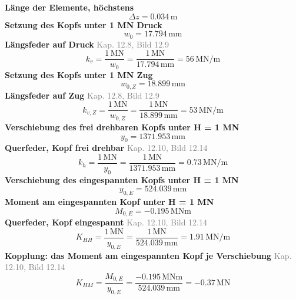 \documentclass[11pt,a4paper]{article}
\newcommand{\normref}[1]{{\small\textcolor{gray}{#1}}}
\begin{document}
\noindent\textbf{Länge der Elemente, höchstens}
\begin{equation*}
\Delta z = 0.034\,\mathrm{m}
\end{equation*}
\noindent\textbf{Setzung des Kopfs unter 1 MN Druck}
\begin{equation*}
w_0 = 17.794\,\mathrm{mm}
\end{equation*}
\noindent\textbf{Längsfeder auf Druck} \hfill \normref{Kap. 12.8, Bild 12.9}
\begin{equation*}
k_v = \frac{1\,\mathrm{MN}}{w_0} = \frac{1\,\mathrm{MN}}{17.794\,\mathrm{mm}} = 56\,\mathrm{MN}/\mathrm{m}
\end{equation*}
\noindent\textbf{Setzung des Kopfs unter 1 MN Zug}
\begin{equation*}
w_{0,Z} = 18.899\,\mathrm{mm}
\end{equation*}
\noindent\textbf{Längsfeder auf Zug} \hfill \normref{Kap. 12.8, Bild 12.9}
\begin{equation*}
k_{v,Z} = \frac{1\,\mathrm{MN}}{w_{0,Z}} = \frac{1\,\mathrm{MN}}{18.899\,\mathrm{mm}} = 53\,\mathrm{MN}/\mathrm{m}
\end{equation*}
\noindent\textbf{Verschiebung des frei drehbaren Kopfs unter H = 1 MN}
\begin{equation*}
y_0 = 1371.953\,\mathrm{mm}
\end{equation*}
\noindent\textbf{Querfeder, Kopf frei drehbar} \hfill \normref{Kap. 12.10, Bild 12.14}
\begin{equation*}
k_h = \frac{1\,\mathrm{MN}}{y_0} = \frac{1\,\mathrm{MN}}{1371.953\,\mathrm{mm}} = 0.73\,\mathrm{MN}/\mathrm{m}
\end{equation*}
\noindent\textbf{Verschiebung des eingespannten Kopfs unter H = 1 MN}
\begin{equation*}
y_{0,E} = 524.039\,\mathrm{mm}
\end{equation*}
\noindent\textbf{Moment am eingespannten Kopf unter H = 1 MN}
\begin{equation*}
M_{0,E} = -0.195\,\mathrm{MNm}
\end{equation*}
\noindent\textbf{Querfeder, Kopf eingespannt} \hfill \normref{Kap. 12.10, Bild 12.14}
\begin{equation*}
K_{HH} = \frac{1\,\mathrm{MN}}{y_{0,E}} = \frac{1\,\mathrm{MN}}{524.039\,\mathrm{mm}} = 1.91\,\mathrm{MN}/\mathrm{m}
\end{equation*}
\noindent\textbf{Kopplung: das Moment am eingespannten Kopf je Verschiebung} \hfill \normref{Kap. 12.10, Bild 12.14}
\begin{equation*}
K_{HM} = \frac{M_{0,E}}{y_{0,E}} = \frac{-0.195\,\mathrm{MNm}}{524.039\,\mathrm{mm}} = -0.37\,\mathrm{MN}
\end{equation*}
\end{document}
